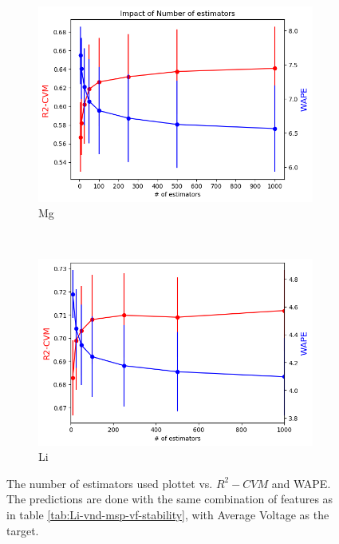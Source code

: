 \begin{figure}[h]
    \centering
    \begin{subfigure}{0.45\textwidth}
        \centering
        \includegraphics[width=\linewidth]{result/figures/Mg_n_estimators-2.png}
        \caption{Mg}
        \label{fig:Mg_n_estimators}
    \end{subfigure}%
    ~ 
        \begin{subfigure}{0.45\textwidth}
        \centering
        \includegraphics[width=\linewidth]{result/figures/Li_number_of_estimators-4.png}
        \caption{Li}
        \label{fig:Li_size_db}
    \end{subfigure}
	\caption{The number of estimators used plottet vs. $R^2-CVM$ and WAPE. The predictions are done with the same combination of features as in table \ref{tab:Li-vnd-msp-vf-stability}, with Average Voltage as the target.}
	\label{fig:trees_size}
\end{figure}


